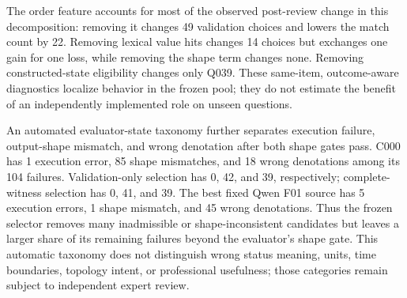 \documentclass[applsci,article,submit,moreauthors]{Definitions/mdpi}
\begin{document}
\begin{table}[htbp]
\caption{Post-review role-utilization and single-component diagnostics under the unified evaluator. Changes, gains, and losses are relative to the stated parent and use the original candidate order.}
\label{tab:role-ablation}
\centering
\small
{}
\end{table}

The order feature accounts for most of the observed post-review change in this decomposition: removing it changes 49 validation choices and lowers the match count by 22. Removing lexical value hits changes 14 choices but exchanges one gain for one loss, while removing the shape term changes none. Removing constructed-state eligibility changes only Q039. These same-item, outcome-aware diagnostics localize behavior in the frozen pool; they do not estimate the benefit of an independently implemented role on unseen questions.

An automated evaluator-state taxonomy further separates execution failure, output-shape mismatch, and wrong denotation after both shape gates pass. C000 has 1 execution error, 85 shape mismatches, and 18 wrong denotations among its 104 failures. Validation-only selection has 0, 42, and 39, respectively; complete-witness selection has 0, 41, and 39. The best fixed Qwen F01 source has 5 execution errors, 1 shape mismatch, and 45 wrong denotations. Thus the frozen selector removes many inadmissible or shape-inconsistent candidates but leaves a larger share of its remaining failures beyond the evaluator's shape gate. This automatic taxonomy does not distinguish wrong status meaning, units, time boundaries, topology intent, or professional usefulness; those categories remain subject to independent expert review.
\end{document}
